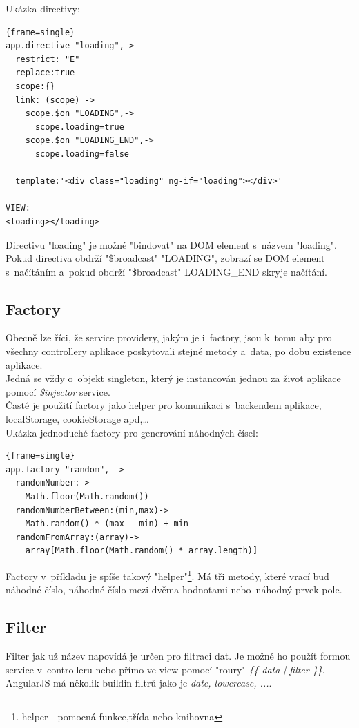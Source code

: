 \documentclass[a4paper,12pt,twoside,BCOR=10mm]{article}
\renewcommand{\it}[1]{\textit{#1}}    %
\newenvironment{codeframe}{%
  \begin{Sbox} 
    \begin{minipage} 
      {\columnwidth-\leftmargin-\rightmargin-2\fboxsep-2\fboxrule-4pt} 
}{%

  \end{minipage} 
  \end{Sbox} 
  \begin{center} 
    \fcolorbox{black}{codeback}{\TheSbox} 
  \end{center} 
}
\begin{document}
Ukázka directivy:
     \begin{codeframe} 
      \begin{Verbatim}{frame=single}
app.directive "loading",->
  restrict: "E"
  replace:true
  scope:{}
  link: (scope) ->
    scope.$on "LOADING",->
      scope.loading=true
    scope.$on "LOADING_END",->
      scope.loading=false

  template:'<div class="loading" ng-if="loading"></div>'

VIEW:
<loading></loading>
\end{Verbatim} 
    \end{codeframe}
Directivu "loading" je možné "bindovat" na DOM element s~názvem "loading". Pokud directiva obdrží "\$broadcast" "LOADING", zobrazí se DOM element s~načítáním a~pokud obdrží "\$broadcast" LOADING\_END skryje načítání.\cite{ngBOOK}

\subsection{Factory}
Obecně lze říci, že service providery, jakým je i~factory, jsou k~tomu aby pro všechny controllery aplikace poskytovali stejné metody a~data, po dobu existence aplikace.\\
Jedná se vždy o~objekt singleton, který je instancován jednou za život aplikace pomocí \it{\$injector} service.\cite{ngBOOK}\\
Časté je použití factory jako helper pro komunikaci s~backendem aplikace, localStorage, cookieStorage apd,…\\

Ukázka jednoduché factory pro generování náhodných čísel:
     \begin{codeframe} 
      \begin{Verbatim}{frame=single}
app.factory "random", ->
  randomNumber:->
    Math.floor(Math.random())
  randomNumberBetween:(min,max)->
    Math.random() * (max - min) + min
  randomFromArray:(array)->
    array[Math.floor(Math.random() * array.length)]
\end{Verbatim} 
    \end{codeframe}
Factory v~příkladu je spíše takový "helper"\footnote{helper - pomocná funkce,třída nebo knihovna}. Má tři metody, které vrací buď náhodné číslo, náhodné číslo mezi dvěma hodnotami nebo~náhodný prvek pole.

\subsection{Filter}
Filter jak už název napovídá je určen pro filtraci dat. Je možné ho použít formou service v~controlleru nebo přímo ve view pomocí "roury" \it{\{\{ data | filter \}\}}. AngularJS má několik buildin filtrů jako je \it{date, lowercase, ...}.\cite{ngBOOK}
\end{document}
